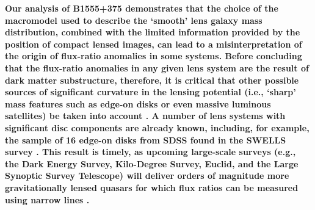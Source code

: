 \documentclass[a4paper,fleqn,usenatbib,useAMS]{mnras}
\begin{document}
\textbf{ Our analysis of B1555+375 demonstrates that the choice of the macromodel used to describe the `smooth' lens galaxy mass distribution, combined with the limited information provided by the position of compact lensed images, can lead to a misinterpretation of the origin of flux-ratio anomalies in some systems. Before concluding that the flux-ratio anomalies in any given lens system are the result of dark matter substructure, therefore, it is critical that other possible sources of significant curvature in the lensing potential (i.e., `sharp' mass features such as edge-on disks or even massive luminous satellites) be taken into account 
\citep[e.g.][]{Xu15}. A number of lens systems with significant disc components are
already known, including, for example, the sample of 16 edge-on disks from SDSS found in the SWELLS survey \citep{swells1}.  This result is timely, as upcoming large-scale surveys (e.g., the Dark Energy Survey, Kilo-Degree Survey, Euclid, and the Large Synoptic Survey Telescope) will deliver orders of magnitude more gravitationally lensed quasars for which flux ratios can
  be measured using narrow lines \citep[e.g.][]{N14}.}

 
\end{document}
